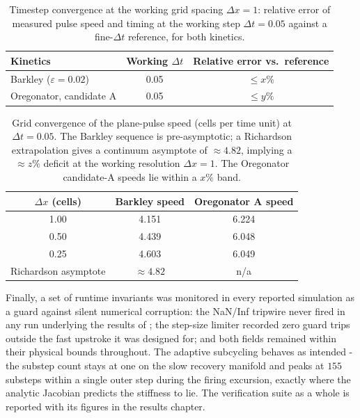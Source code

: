 \begin{table}[htbp]
\centering
\caption{Timestep convergence at the working grid spacing $\Delta x = 1$: relative error of measured pulse speed and timing at the working step $\Delta t = 0.05$ against a fine-$\Delta t$ reference, for both kinetics.}
\label{tab:timestep_convergence}
\small
\begin{tabular}{@{}lcc@{}}
\toprule
\textbf{Kinetics} & \textbf{Working $\Delta t$} & \textbf{Relative error vs.\ reference} \\
\midrule
Barkley ($\varepsilon = 0.02$) & 0.05 & $\leq x\%$ \\
Oregonator, candidate A & 0.05 & $\leq y\%$ \\
\bottomrule
\end{tabular}
\end{table}

\begin{table}[htbp]
\centering
\caption{Grid convergence of the plane-pulse speed (cells per time unit) at $\Delta t = 0.05$. The Barkley sequence is pre-asymptotic; a Richardson extrapolation gives a continuum asymptote of $\approx 4.82$, implying a $\approx z\%$ deficit at the working resolution $\Delta x = 1$. The Oregonator candidate-A speeds lie within a $x\%$ band.}
\label{tab:grid_convergence}
\small
\begin{tabular}{@{}ccc@{}}
\toprule
\textbf{$\Delta x$ (cells)} & \textbf{Barkley speed} & \textbf{Oregonator A speed} \\
\midrule
1.00 & 4.151 & 6.224 \\
0.50 & 4.439 & 6.048 \\
0.25 & 4.603 & 6.049 \\
\midrule
Richardson asymptote & $\approx 4.82$ & n/a \\
\bottomrule
\end{tabular}
\end{table}

Finally, a set of runtime invariants was monitored in every reported simulation as a guard against silent numerical corruption: the NaN/Inf tripwire never fired in any run underlying the results of ; the step-size limiter recorded zero guard trips outside the fast upstroke it was designed for; and both fields remained within their physical bounds throughout. 
The adaptive subcycling behaves as intended - the substep count stays at one on the slow recovery manifold and peaks at $155$ substeps within a single outer step during the firing excursion, exactly where the analytic Jacobian predicts the stiffness to lie. 
The verification suite as a whole is reported with its figures in the results chapter. 

